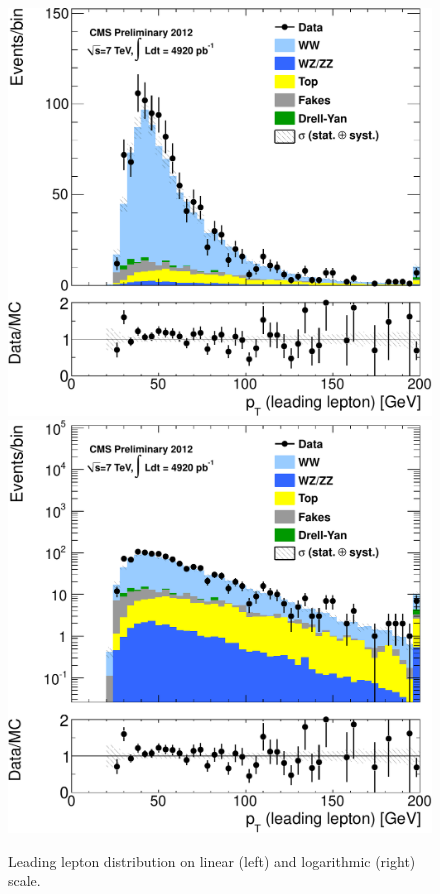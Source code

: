 \begin{figure}[t]
\includegraphics[width=.45\textwidth]{figures/pas_pt1_incl.pdf}
\includegraphics[width=.45\textwidth]{figures/pas_pt1_incl_log.pdf}
\caption{Leading lepton \pt distribution on linear (left) and logarithmic (right) scale.}
\label{fig:pas_pt1_incl}
\end{figure}

